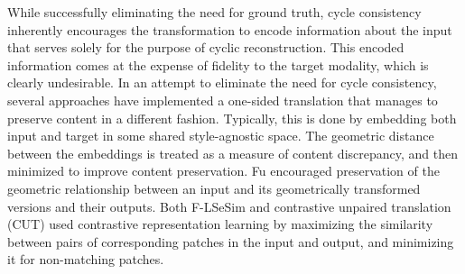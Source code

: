 While successfully eliminating the need for ground truth, cycle consistency inherently encourages the transformation to encode information about the input that serves solely for the purpose of cyclic reconstruction.
This encoded information comes at the expense of fidelity to the target modality, which is clearly undesirable.
In an attempt to eliminate the need for cycle consistency, several approaches have implemented a one-sided translation that manages to preserve content in a different fashion.
Typically, this is done by embedding both input and target in some shared style-agnostic space. 
The geometric distance between the embeddings is treated as a measure of content discrepancy, and then minimized to improve content preservation.
Fu \etal \cite{fu2019geometry} encouraged preservation of the geometric relationship between an input and its geometrically transformed versions and their outputs. 
Both F-LSeSim \cite{zheng2021spatially} and contrastive unpaired translation (CUT) \cite{park2020cut} used contrastive representation learning by maximizing the similarity between pairs of corresponding patches in the input and output, and minimizing it for non-matching patches.